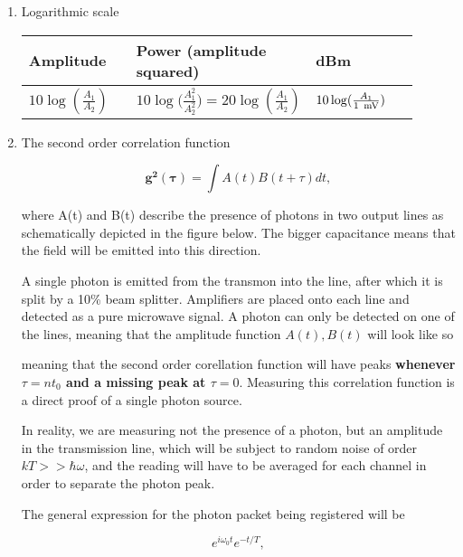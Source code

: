 \begin{enumerate}
	\item Logarithmic scale
	
	\begin{center}
		\begin{tabular}{|p{0.3\linewidth}|p{0.3\linewidth}|p{0.3\linewidth}|}
			\hline 
			\textbf{Amplitude} & \textbf{Power} (amplitude squared) & \textbf{dBm} \\ 
			\hline 
			$ 10\log(\frac{A_1}{A_2}) $ & $ 10\log\big(\frac{A_1^{2}}{A_2^{2}}\big) = 20\log(\frac{A_1}{A_2}) $& $ 10\log(\frac{A_1}{1\text{\, mV}}) $ \\ 
			\hline 
		\end{tabular} 
	\end{center}
	\item The second order correlation function 
	
	\begin{equation}
	\mathbf{g^2(\tau)} = \int A(t)B(t+\tau)dt,
	\end{equation}
	
	\noindent where A(t) and B(t) describe the presence of photons in two output lines as schematically depicted in the figure below. The bigger capacitance means that the field will be emitted into this direction.
	
	A single photon is emitted from the transmon into the line, after which it is split by a 10\% beam splitter. Amplifiers are placed onto each line and detected as a pure microwave signal. A photon can only be detected on one of the lines, meaning that the amplitude function $ A(t), B(t) $ will look like so
	
	
	\noindent meaning that the second order corellation function will have peaks \textbf{whenever $ \tau = nt_0 $ and a missing peak at $ \tau=0 $}. Measuring this correlation function is a direct proof of a single photon source.
	
	In reality, we are measuring not the presence of a photon, but an amplitude in the transmission line, which will be subject to random noise of order $ kT >> \hbar\omega $, and the reading will have to be averaged for each channel in order to separate the photon peak.
	
	The general expression for the photon packet being registered will be
	
	\begin{equation}\label{key}
	e^{i\omega_0 t}e^{-t/T},
	\end{equation}
	

\end{enumerate}
